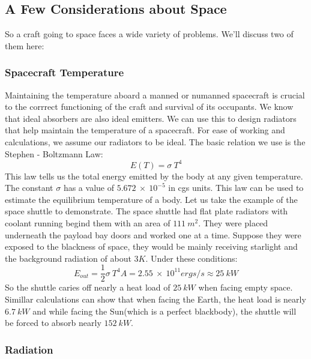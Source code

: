\documentclass[12pt, letterpaper]{article}
\begin{document}
\subsection{A Few Considerations about Space}
So a craft going to space faces a wide variety of problems. We'll discuss two of them here:

\subsubsection{Spacecraft Temperature}
Maintaining the temperature aboard a manned or numanned spacecraft is crucial to the corrrect functioning of the craft and survival of its occupants. We know that ideal absorbers are also ideal emitters. We can use this to design radiators that help maintain the temperature of a spacecraft. For ease of working and calculations, we assume our radiators to be ideal. The basic relation we use is the Stephen - Boltzmann Law:
\[
	E(T) = \sigma \:T^4 
\]
This law tells us the total energy emitted by the body at any given temperature. The constant $\sigma$ has a value of $5.672 \: \times \: 10^{-5} $ in cgs units. This law can be used to estimate the equilibrium temperature of a body. Let us take the example of the space shuttle to demonstrate. The space shuttle had flat plate radiators with coolant running begind them with an area of $111\: m^2$.
They were placed underneath the payload bay doors and worked one at a time. Suppose they were exposed to the blackness of space, they would be mainly receiving starlight and the background radiation of about $3K$. Under these conditions:
\[
	E_{out} = \frac{1}{2}\sigma \:T^4 A= 2.55\: \times \: 10^{11} ergs/s \approx 25\:kW
\] 
So the shuttle caries off nearly a heat load of $25\:kW$ when facing empty space. Simillar calculations can show that when facing the Earth, the heat load is nearly $6.7\:kW$ and while facing the Sun(which is a perfect blackbody), the shuttle will be forced to absorb nearly $152\:kW$.

\subsubsection{Radiation}
\end{document}
